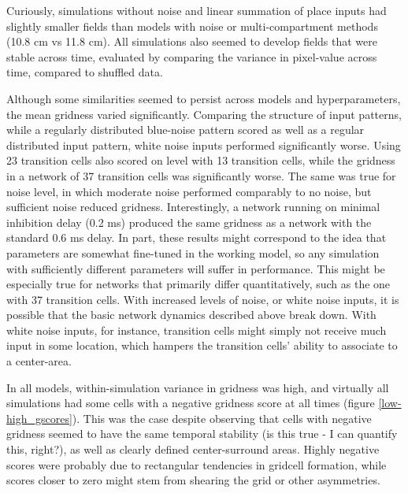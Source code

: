 \documentclass{article}
\begin{document}
    Curiously, simulations without noise and linear summation of place inputs had slightly smaller fields than models with noise or multi-compartment methods (10.8 cm vs 11.8 cm). All simulations also seemed to develop fields that were stable across time, evaluated by comparing the variance in pixel-value across time, compared to shuffled data.

    Although some similarities seemed to persist across models and hyperparameters, the mean gridness varied significantly. Comparing the structure of input patterns, while a regularly distributed blue-noise pattern scored as well as a regular distributed input pattern, white noise inputs performed significantly worse.  Using 23 transition cells also scored on level with 13 transition cells, while the gridness in a network of 37 transition cells was significantly worse. The same was true for noise level, in which moderate noise performed comparably to no noise, but sufficient noise reduced gridness. Interestingly, a network running on minimal inhibition delay (0.2 ms) produced the same gridness as a network with the standard 0.6 ms delay.
    In part, these results might correspond to the idea that parameters are somewhat fine-tuned in the working model, so any simulation with sufficiently different parameters will suffer in performance. This might be especially true for networks that primarily differ quantitatively, such as the one with 37 transition cells. With increased levels of noise, or white noise inputs, it is possible that the basic network dynamics described above break down. With white noise inputs, for instance, transition cells might simply not receive much input in some location, which hampers the transition cells' ability to associate to a center-area. 

    In all models, within-simulation variance in gridness was high, and virtually all simulations had some cells with a negative gridness score at all times (figure \ref{low-high_gscores}). This was the case despite observing that cells with negative gridness seemed to have the same temporal stability (is this true - I can quantify this, right?), as well as clearly defined center-surround areas. Highly negative scores were probably due to rectangular tendencies in gridcell formation, while scores closer to zero might stem from shearing the grid or other asymmetries. 
\end{document}
